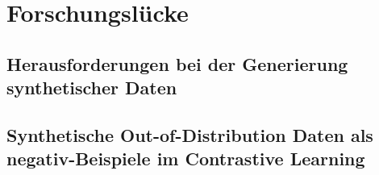 


\section{Forschungslücke} \label{sec-research-gap}



\subsection{Herausforderungen bei der Generierung synthetischer Daten} \label{subsec-challenges-synt-data}



\subsection{Synthetische Out-of-Distribution Daten als negativ-Beispiele im Contrastive Learning} \label{subsec-synt-ood-contrastive}


